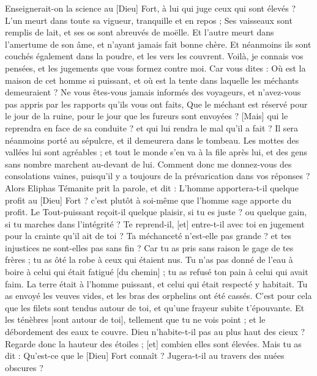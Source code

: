\begin{multicols}{2}
Enseignerait-on la science au [Dieu] Fort, à lui qui juge ceux qui sont élevés ?
L'un meurt dans toute sa vigueur, tranquille et en repos ;
Ses vaisseaux sont remplis de lait, et ses os sont abreuvés de moëlle.
Et l'autre meurt dans l'amertume de son âme, et n'ayant jamais fait bonne chère.
Et néanmoins ils sont couchés également dans la poudre, et les vers les couvrent.
Voilà, je connais vos pensées, et les jugements que vous formez contre moi.
Car vous dites : Où est la maison de cet homme si puissant, et où est la tente dans laquelle les méchants demeuraient ?
Ne vous êtes-vous jamais informés des voyageurs, et n'avez-vous pas appris par les rapports qu'ils vous ont faits,
Que le méchant est réservé pour le jour de la ruine, pour le jour que les fureurs sont envoyées ?
[Mais] qui le reprendra en face de sa conduite ? et qui lui rendra le mal qu'il a fait ?
Il sera néanmoins porté au sépulcre, et il demeurera dans le tombeau.
Les mottes des vallées lui sont agréables ; et tout le monde s'en va à la file après lui, et des gens sans nombre marchent au-devant de lui.
Comment donc me donnez-vous des consolations vaines, puisqu'il y a toujours de la prévarication dans vos réponses ?
\VerseOne{}Alors Eliphas Témanite prit la parole, et dit :
L'homme apportera-t-il quelque profit au [Dieu] Fort ? c'est plutôt à soi-même que l'homme sage apporte du profit.
Le Tout-puissant reçoit-il quelque plaisir, si tu es juste ? ou quelque gain, si tu marches dans l'intégrité ?
Te reprend-il, [et] entre-t-il avec toi en jugement pour la crainte qu'il ait de toi ?
Ta méchanceté n'est-elle pas grande ? et tes injustices ne sont-elles pas sans fin ?
Car tu as pris sans raison le gage de tes frères ; tu as ôté la robe à ceux qui étaient nus.
Tu n'as pas donné de l'eau à boire à celui qui était fatigué [du chemin] ; tu as refusé ton pain à celui qui avait faim.
La terre était à l'homme puissant, et celui qui était respecté y habitait.
Tu as envoyé les veuves vides, et les bras des orphelins ont été cassés.
C'est pour cela que les filets sont tendus autour de toi, et qu'une frayeur subite t'épouvante.
Et les ténèbres [sont autour de toi], tellement que tu ne vois point ; et le débordement des eaux te couvre.
Dieu n'habite-t-il pas au plus haut des cieux ? Regarde donc la hauteur des étoiles ; [et] combien elles sont élevées.
Mais tu as dit : Qu'est-ce que le [Dieu] Fort connaît ? Jugera-t-il au travers des nuées obscures ?

\end{multicols}
